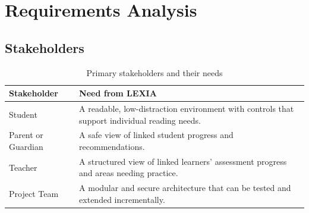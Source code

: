 \documentclass[a4paper]{tietreport}
\begin{document}
\chapter{Requirements Analysis}
\section{Stakeholders}
\begin{table}[H]
\centering
\begin{tabular}{p{} p{}}
\toprule
\textbf{Stakeholder} & \textbf{Need from LEXIA} \\
\midrule
Student & A readable, low-distraction environment with controls that support individual reading needs. \\
Parent or Guardian & A safe view of linked student progress and recommendations. \\
Teacher & A structured view of linked learners' assessment progress and areas needing practice. \\
Project Team & A modular and secure architecture that can be tested and extended incrementally. \\
\bottomrule
\end{tabular}
\caption{Primary stakeholders and their needs}
\end{table}
\end{document}
